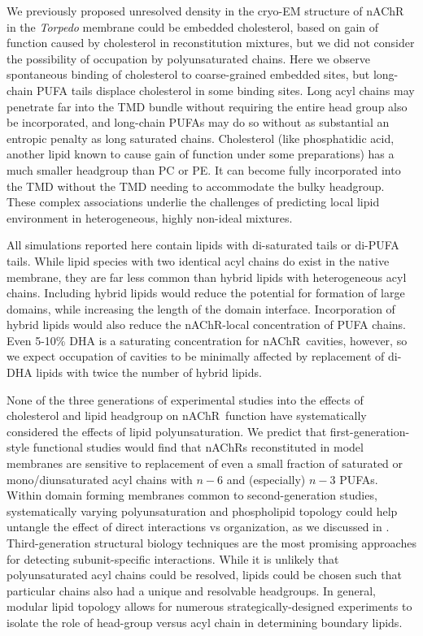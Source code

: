 \documentclass[final,3p,times,twocolumn]{elsarticle}
\newcommand{\nachr}{nAChR}
\begin{document}
We previously \cite{Brannigan_Embedded_2008} proposed unresolved density in the cryo-EM structure of \nachr~ in the {\it Torpedo} membrane could be embedded cholesterol, based on gain of function caused by cholesterol in reconstitution mixtures\cite{Fong_Correlation_1986,Sunshine_Lipid_1992,Hamouda_Assessing_2006,Butler_FTIR_1993,Bhushan_Correlation_1993,Fong_Stabilization_1987,Bednarczyk_Transmembrane_2002,Corrie_Lipid_2002}, but we did not consider the possibility of occupation by polyunsaturated chains.  
Here we observe spontaneous binding of cholesterol to coarse-grained embedded sites, but long-chain PUFA tails displace cholesterol in some binding sites. Long acyl chains may penetrate far into the TMD bundle without requiring the entire head group also be incorporated, and long-chain PUFAs may do so without as substantial an entropic penalty as long saturated chains.  Cholesterol (like phosphatidic acid, another lipid known to cause gain of function under some preparations\cite{Butler_FTIR_1993,Bhushan_Correlation_1993,Fong_Stabilization_1987,Bednarczyk_Transmembrane_2002,Corrie_Lipid_2002})  has a much smaller headgroup than PC or PE. It can become fully incorporated into the TMD without the TMD needing to accommodate the bulky headgroup.   These complex associations underlie the challenges of predicting local lipid environment in heterogeneous, highly non-ideal mixtures. 

All simulations reported here contain lipids with di-saturated tails or di-PUFA tails. While lipid species with two identical acyl chains do exist in the native membrane, they are far less common than hybrid lipids with heterogeneous acyl chains.  Including hybrid lipids would reduce the potential for formation of large domains, while increasing the length of the domain interface. 
Incorporation of hybrid lipids would also reduce the \nachr-local concentration of PUFA chains.  Even 5-10\% DHA is a saturating concentration for \nachr~cavities, however, so we expect occupation of cavities to be minimally affected by replacement of di-DHA lipids with twice the number of hybrid lipids. 

None of the three generations of experimental studies into the effects of cholesterol and lipid headgroup on \nachr~function have systematically considered the effects of lipid polyunsaturation. We predict that first-generation-style functional studies would find that \nachr s reconstituted in model membranes are sensitive to replacement of even a small fraction of saturated or mono/diunsaturated acyl chains with $n-6$ and (especially) $n-3$ PUFAs. Within domain forming membranes common to second-generation studies, systematically varying polyunsaturation and phospholipid topology could help untangle the effect of direct interactions vs organization, as we discussed in \cite{Brannigan2017}. Third-generation structural biology techniques are the most promising approaches for detecting subunit-specific interactions. While it is unlikely that polyunsaturated acyl chains could be resolved, lipids could be chosen such that particular chains also had a unique and resolvable headgroups. In general, modular lipid topology allows for numerous strategically-designed experiments to isolate the role of head-group versus acyl chain in determining boundary lipids. 
\end{document}
